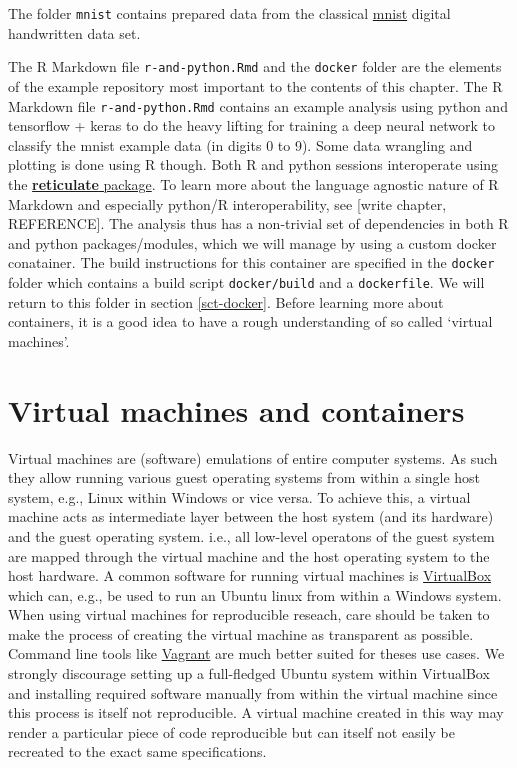 \documentclass[]{book}
\begin{document}
The folder \texttt{mnist} contains prepared data from the classical
\href{http://yann.lecun.com/exdb/mnist/}{mnist} digital handwritten data
set.

The R Markdown file \texttt{r-and-python.Rmd} and the \texttt{docker}
folder are the elements of the example repository most important to the
contents of this chapter. The R Markdown file \texttt{r-and-python.Rmd}
contains an example analysis using python and tensorflow + keras to do
the heavy lifting for training a deep neural network to classify the
mnist example data (in digits 0 to 9). Some data wrangling and plotting
is done using R though. Both R and python sessions interoperate using
the \href{https://github.com/rstudio/reticulate}{\textbf{reticulate}
package}. To learn more about the language agnostic nature of R Markdown
and especially python/R interoperability, see {[}write chapter,
REFERENCE{]}. The analysis thus has a non-trivial set of dependencies in
both R and python packages/modules, which we will manage by using a
custom docker conatainer. The build instructions for this container are
specified in the \texttt{docker} folder which contains a build script
\texttt{docker/build} and a \texttt{dockerfile}. We will return to this
folder in section \ref{sct-docker}. Before learning more about
containers, it is a good idea to have a rough understanding of so called
`virtual machines'.

\section{Virtual machines and
containers}\label{virtual-machines-and-containers}

Virtual machines are (software) emulations of entire computer systems.
As such they allow running various guest operating systems from within a
single host system, e.g., Linux within Windows or vice versa. To achieve
this, a virtual machine acts as intermediate layer between the host
system (and its hardware) and the guest operating system. i.e., all
low-level operatons of the guest system are mapped through the virtual
machine and the host operating system to the host hardware. A common
software for running virtual machines is
\href{https://www.virtualbox.org/}{VirtualBox} which can, e.g., be used
to run an Ubuntu linux from within a Windows system. When using virtual
machines for reproducible reseach, care should be taken to make the
process of creating the virtual machine as transparent as possible.
Command line tools like \href{https://www.vagrantup.com/}{Vagrant} are
much better suited for theses use cases. We strongly discourage setting
up a full-fledged Ubuntu system within VirtualBox and installing
required software manually from within the virtual machine since this
process is itself not reproducible. A virtual machine created in this
way may render a particular piece of code reproducible but can itself
not easily be recreated to the exact same specifications.
\end{document}

